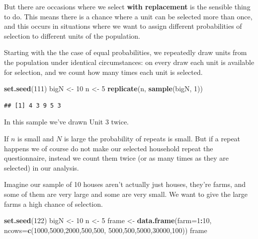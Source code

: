 \documentclass[
]{book}
\newenvironment{Shaded}{\begin{snugshade}}{\end{snugshade}}
\newcommand{\AttributeTok}[1]{\textcolor[rgb]{0.13,0.29,0.53}{#1}}
\newcommand{\DecValTok}[1]{\textcolor[rgb]{0.00,0.00,0.81}{#1}}
\newcommand{\FunctionTok}[1]{\textcolor[rgb]{0.13,0.29,0.53}{\textbf{#1}}}
\newcommand{\NormalTok}[1]{#1}
\newcommand{\OtherTok}[1]{\textcolor[rgb]{0.56,0.35,0.01}{#1}}
\newcommand{\SpecialCharTok}[1]{\textcolor[rgb]{0.81,0.36,0.00}{\textbf{#1}}}
\begin{document}
But there are occasions where we select \textbf{with replacement} is the sensible
thing to do. This means there is a chance where a unit can be selected more than
once, and this occurs in situations where we want to assign different probabilities
of selection to different units of the population.

Starting with the the case of equal probabilities, we repeatedly draw
units from the population under identical circumstances: on every draw
each unit is available for selection, and we count how many times each
unit is selected.

\begin{Shaded}
\begin{Highlighting}[]
\FunctionTok{set.seed}\NormalTok{(}\DecValTok{111}\NormalTok{)}
\NormalTok{bigN }\OtherTok{\textless{}{-}} \DecValTok{10}
\NormalTok{n }\OtherTok{\textless{}{-}} \DecValTok{5}
\FunctionTok{replicate}\NormalTok{(n, }\FunctionTok{sample}\NormalTok{(bigN, }\DecValTok{1}\NormalTok{))}
\end{Highlighting}
\end{Shaded}

\begin{verbatim}
## [1] 4 3 9 5 3
\end{verbatim}

In this sample we've drawn Unit 3 twice.

If \(n\) is small and \(N\) is large the probability of repeats is small. But if a repeat
happens we of course do not make our selected household repeat the questionnaire, instead
we count them twice (or as many times as they are selected) in our analysis.

Imagine our sample of 10 houses aren't actually just houses, they're farms, and some of them
are very large and some are very small. We want to give the large farms a high chance of
selection.

\begin{Shaded}
\begin{Highlighting}[]
\FunctionTok{set.seed}\NormalTok{(}\DecValTok{122}\NormalTok{)}
\NormalTok{bigN }\OtherTok{\textless{}{-}} \DecValTok{10}
\NormalTok{n }\OtherTok{\textless{}{-}} \DecValTok{5}
\NormalTok{frame }\OtherTok{\textless{}{-}} \FunctionTok{data.frame}\NormalTok{(}\AttributeTok{farm=}\DecValTok{1}\SpecialCharTok{:}\DecValTok{10}\NormalTok{, }\AttributeTok{ncows=}\FunctionTok{c}\NormalTok{(}\DecValTok{1000}\NormalTok{,}\DecValTok{5000}\NormalTok{,}\DecValTok{2000}\NormalTok{,}\DecValTok{500}\NormalTok{,}\DecValTok{500}\NormalTok{,}
                                       \DecValTok{5000}\NormalTok{,}\DecValTok{500}\NormalTok{,}\DecValTok{5000}\NormalTok{,}\DecValTok{30000}\NormalTok{,}\DecValTok{100}\NormalTok{))}
\NormalTok{frame}
\end{Highlighting}
\end{Shaded}
\end{document}
